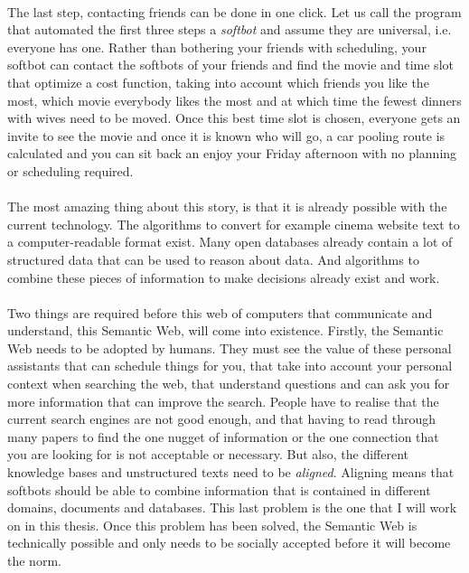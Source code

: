 \documentclass{article}
\begin{document}
 \paragraph{}
 The last step, contacting friends can be done in one click. Let us call the program that automated the first three steps a \emph{softbot} and assume they are universal, i.e. everyone has one. Rather than bothering your friends with scheduling, your softbot can contact the softbots of your friends and find the movie and time slot that optimize a cost function, taking into account which friends you like the most, which movie everybody likes the most and at which time the fewest dinners with wives need to be moved. Once this best time slot is chosen, everyone gets an invite to see the movie and once it is known who will go, a car pooling route is calculated and you can sit back an enjoy your Friday afternoon with no planning or scheduling required.
 \paragraph{}
 The most amazing thing about this story, is that it is already possible with the current technology. The algorithms to convert for example cinema website text to a computer-readable format exist. Many open databases already contain a lot of structured data that can be used to reason about data. And algorithms to combine these pieces of information to make decisions already exist and work.
 \paragraph{}
 Two things are required before this web of computers that communicate and understand, this Semantic Web, will come into existence.
 Firstly, the Semantic Web needs to be adopted by humans. They must see the value of these personal assistants that can schedule things for you, that take into account your personal context when searching the web, that understand questions and can ask you for more information that can improve the search. People have to realise that the current search engines are not good enough, and that having to read through many papers to find the one nugget of information or the one connection that you are looking for is not acceptable or necessary.
 But also, the different knowledge bases and unstructured texts need to be \emph{aligned}. Aligning means that softbots should be able to combine information that is contained in different domains, documents and databases. This last problem is the one that I will work on in this thesis. Once this problem has been solved, the Semantic Web is technically possible and only needs to be socially accepted before it will become the norm.
\end{document}
